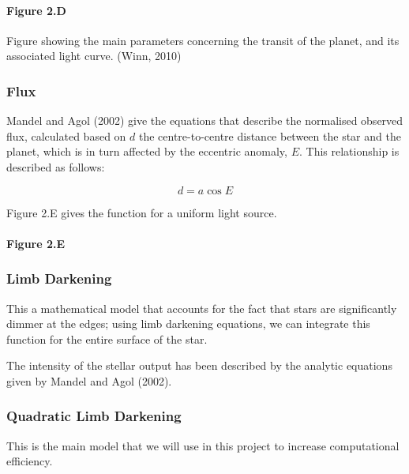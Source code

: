 \documentclass[11pt]{article}
\begin{document}
    \hypertarget{figure-2.d}{%
\paragraph{Figure 2.D}\label{figure-2.d}}

Figure showing the main parameters concerning the transit of the planet,
and its associated light curve. (Winn, 2010)

    \hypertarget{flux}{%
\subsubsection{Flux}\label{flux}}

Mandel and Agol (2002) give the equations that describe the normalised
observed flux, calculated based on \(d\) the centre-to-centre distance
between the star and the planet, which is in turn affected by the
eccentric anomaly, \(E\). This relationship is described as follows:

\begin{equation*}
d = a\cos{E}
\end{equation*}

Figure 2.E gives the function for a uniform light source.

    \hypertarget{figure-2.e}{%
\paragraph{Figure 2.E}\label{figure-2.e}}

    \hypertarget{limb-darkening}{%
\subsubsection{Limb Darkening}\label{limb-darkening}}

This a mathematical model that accounts for the fact that stars are
significantly dimmer at the edges; using limb darkening equations, we
can integrate this function for the entire surface of the star.

The intensity of the stellar output has been described by the analytic
equations given by Mandel and Agol (2002).

\hypertarget{quadratic-limb-darkening}{%
\subsubsection{Quadratic Limb Darkening}\label{quadratic-limb-darkening}}

This is the main model that we will use in this project to increase
computational efficiency.
\end{document}

